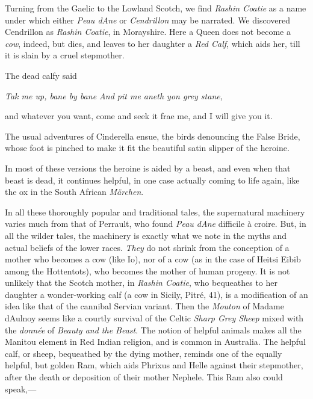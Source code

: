\documentclass[14pt,a4paper]{memoir}
\begin{document}
{Turning from the Gaelic to the Lowland Scotch, we find \emph{Rashin
Coatie} as a name under which either \emph{Peau d\textquotesingle Ane}
or \emph{Cendrillon} may be narrated. We discovered Cendrillon as
\emph{Rashin Coatie}, in
Morayshire.
Here a Queen does not become a \emph{cow}, indeed, but dies, and leaves
to her daughter a \emph{Red Calf}, which aids her, till it is slain by a
cruel stepmother.

The dead calfy said

\emph{{Tak me up, bane by bane} {And pit me aneth yon grey stane,}}

and whatever you want, come and seek it frae me, and I will give you it.

The usual adventures of Cinderella ensue, the birds denouncing the False
Bride, whose foot is pinched to make it fit the
\textquotesingle beautiful satin slipper\textquotesingle{} of the
heroine.

In most of these versions the heroine is aided by a beast, and even when
that beast is dead, it continues helpful, in one case actually coming to
life again, like the ox in the South African
\emph{Märchen}.

In all these thoroughly popular and traditional tales, the supernatural
machinery varies much from that of Perrault, who found \emph{Peau
d\textquotesingle Ane} \textquotesingle difficile à
croire.\textquotesingle{} But, in all the wilder tales, the machinery is
exactly what we note in the myths and actual beliefs of the lower races.
\emph{They} do not shrink from the conception of a mother who becomes a
cow (like Io), nor of a cow (as in the case of Heitsi Eibib among the
Hottentots), who becomes the mother of human progeny. It is not unlikely
that the Scotch mother, in \emph{Rashin Coatie}, who bequeathes to her
daughter a wonder-working calf (a cow in Sicily, Pitré, 41), is a
modification of an idea like that of the cannibal Servian
variant.
Then the \emph{Mouton} of Madame d\textquotesingle Aulnoy seems like a
courtly survival of the Celtic \emph{Sharp Grey Sheep} mixed with the
\emph{donnée} of \emph{Beauty and the
Beast}.
The notion of helpful animals makes all the
\textquotesingle Manitou\textquotesingle{} element in Red Indian
religion, and is common in Australia. The helpful calf, or sheep,
bequeathed by the dying mother, reminds one of the equally helpful, but
golden Ram, which aids Phrixus and Helle against their stepmother, after
the death or deposition of their mother Nephele. This Ram also could
speak,---

}
\end{document}
